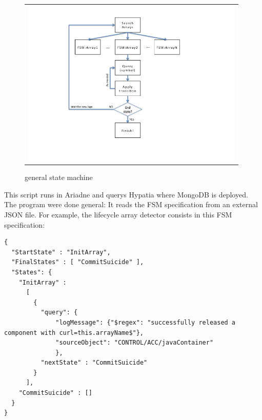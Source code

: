\documentclass[]{spie}  %
\begin{document}
   \begin{figure}[!ht]
   \begin{center}
   \begin{tabular}{c}
   \includegraphics[height=8.0cm]{../img/FSM-flow-diagram.png}
   \end{tabular}
   \end{center}
   \caption[fsm] 
   { \label{fig:fsm} general state machine}
   \end{figure} 

This script runs in Ariadne and querys Hypatia where MongoDB is deployed. The
program were done general: It reads the FSM specification from an external JSON
file. For example, the lifecycle array detector consists in this FSM
specification:
{\small 
\begin{verbatim}
{
  "StartState" : "InitArray",
  "FinalStates" : [ "CommitSuicide" ],
  "States": {
    "InitArray" : 
      [
        { 
          "query": {
              "logMessage": {"$regex": "successfully released a component with curl=this.arrayName$"},
              "sourceObject": "CONTROL/ACC/javaContainer"
              },
          "nextState" : "CommitSuicide"
        }
      ],
    "CommitSuicide" : []
  }
}

\end{verbatim}
}
\end{document}
